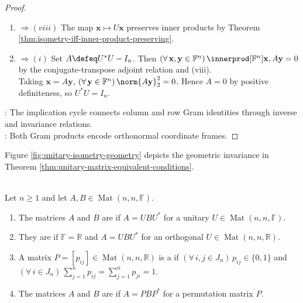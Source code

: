 \begin{theorem}
\begin{proof}
\begin{enumerate}[label=(\roman*)]
Hence $(\forall\,\mathbf{x}\in\mathbb{F}^n)\,\norm{U\mathbf{x}}_2^2=\innerprod[\mathbb{F}^n]{\mathbf{x},U^*U\mathbf{x}}=\norm{\mathbf{x}}_2^2$ by the conjugate-transpose adjoint relation.\\
Thus $U$ preserves norms by nonnegativity.
\item[$(vii)$] $\Rightarrow (viii)$ The map $\mathbf{x}\mapsto U\mathbf{x}$ preserves inner products by Theorem \ref{thm:isometry-iff-inner-product-preserving}.
\item[$(viii)$] $\Rightarrow (i)$ Set $A\defeq U^*U-I_n$. Then $(\forall\,\mathbf{x},\mathbf{y}\in\mathbb{F}^n)\,\innerprod[\mathbb{F}^n]{\mathbf{x},A\mathbf{y}}=0$ by the conjugate-transpose adjoint relation and (viii).\\
Taking $\mathbf{x}=A\mathbf{y}$, $(\forall\,\mathbf{y}\in\mathbb{F}^n)\,\norm{A\mathbf{y}}_2^2=0$. Hence $A=0$ by positive definiteness, so $U^*U=I_n$.
\end{enumerate}
: The implication cycle connects column and row Gram identities through inverse and invariance relations.\\
: Both Gram products encode orthonormal coordinate frames.
\end{proof}
\end{theorem}

Figure \ref{fig:unitary-isometry-geometry} depicts the geometric invariance in Theorem \ref{thm:unitary-matrix-equivalent-conditions}.
\begin{illustrationfigure}[H]
  \centering
  
  \caption{A unitary map preserves the lengths and right angle of an orthonormal pair.}
  \label{fig:unitary-isometry-geometry}
\end{illustrationfigure}

\begin{definition} \label{def:unitary-and-permutation-similarity} \\
Let $n\geq1$ and let $A,B\in\operatorname{Mat}(n,n,\mathbb{F})$.
\begin{enumerate}[label=(\roman*)]
\setlength{\itemsep}{0pt}
\item The matrices $A$ and $B$ are  if $A=UBU^*$ for a unitary $U\in\operatorname{Mat}(n,n,\mathbb{F})$.
\item They are  if $\mathbb{F}=\mathbb{R}$ and $A=UBU^*$ for an orthogonal $U\in\operatorname{Mat}(n,n,\mathbb{R})$.
\item A matrix $P=[p_{ij}]\in\operatorname{Mat}(n,n,\mathbb{R})$ is a  if $(\forall\,i,j\in J_n)\,p_{ij}\in\{0,1\}$ and $(\forall\,i\in J_n)\,\sum\limits_{j=1}^{n}p_{ij}=\sum\limits_{j=1}^{n}p_{ji}=1$.
\item The matrices $A$ and $B$ are  if $A=PBP^*$ for a permutation matrix $P$.
\end{enumerate}
\end{definition}

